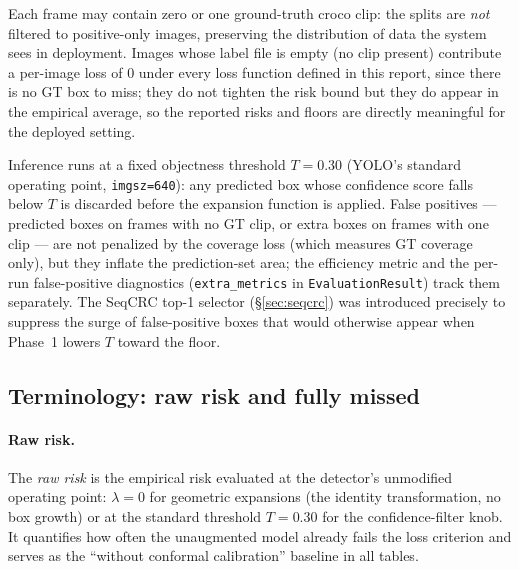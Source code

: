 \documentclass[11pt,a4paper]{article}
\newcommand{\code}[1]{\texttt{\small #1}}
\begin{document}
Each frame may contain zero or one ground-truth croco clip: the splits are
\emph{not} filtered to positive-only images, preserving the distribution of
data the system sees in deployment. Images whose label file is empty (no clip
present) contribute a per-image loss of $0$ under every loss function defined in
this report, since there is no GT box to miss; they do not tighten the risk bound
but they do appear in the empirical average, so the reported risks and floors are
directly meaningful for the deployed setting.

Inference runs at a fixed objectness threshold $T = 0.30$ (YOLO's standard
operating point, \code{imgsz=640}): any predicted box whose confidence score falls
below $T$ is discarded before the expansion function is applied. False positives
--- predicted boxes on frames with no GT clip, or extra boxes on frames with one
clip --- are not penalized by the coverage loss (which measures GT coverage only),
but they inflate the prediction-set area; the efficiency metric and the per-run
false-positive diagnostics (\code{extra\_metrics} in \code{EvaluationResult})
track them separately. The SeqCRC top-1 selector (\S\ref{sec:seqcrc}) was
introduced precisely to suppress the surge of false-positive boxes that would
otherwise appear when Phase~1 lowers $T$ toward the floor.

\subsection{Terminology: raw risk and fully missed}

\paragraph{Raw risk.} The \emph{raw risk} is the empirical risk evaluated at the
detector's unmodified operating point: $\lambda = 0$ for geometric expansions
(the identity transformation, no box growth) or at the standard threshold
$T = 0.30$ for the confidence-filter knob. It quantifies how often the
unaugmented model already fails the loss criterion and serves as the
``without conformal calibration'' baseline in all tables.
\end{document}
